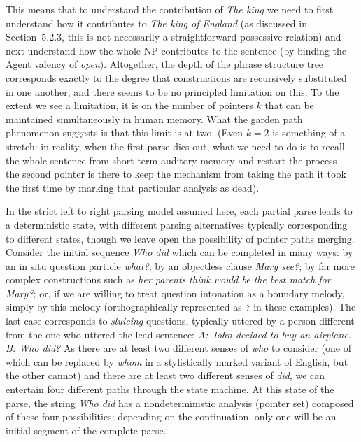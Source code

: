 This means that to understand the contribution of {\it The king} we need to
first understand how it contributes to {\it The king of England} (as discussed
in Section~5.2.3, this is not necessarily a straightforward possessive
relation) and next understand how the whole NP contributes to the sentence (by
binding the Agent valency of {\it open}).  Altogether, the depth of the phrase
structure tree corresponds exactly to the degree that constructions are
recursively substituted in one another, and there seems to be no principled
limitation on this. To the extent we see a limitation, it is on the number of
pointers $k$ that can be maintained simultaneously in human memory. What the
garden path phenomenon suggests is that this limit is at two. (Even $k=2$ is
something of a stretch: in reality, when the first parse dies out, what we
need to do is to recall the whole sentence from short-term auditory memory and
restart the process -- the second pointer is there to keep the mechanism from
taking the path it took the first time by marking that particular analysis as
dead).

In the strict left to right parsing model assumed here, each partial parse
leads to a deterministic state, with different parsing alternatives typically
corresponding to different states, though we leave open the possibility of
pointer paths merging. Consider the initial sequence {\it Who did} which can
be completed in many ways: by an in situ question particle {\it what?}; by an
objectless clause {\it Mary see?}; by far more complex constructions such as
{\it her parents think would be the best match for Mary?}; or, if we are
willing to treat question intonation as a boundary melody, simply by this
melody (orthographically represented as {\it ?} in these examples). The last
case corresponds to {\it sluicing} questions, typically
uttered by a person different from the one who uttered the lead sentence: {\it
  A: John decided to buy an airplane. B: Who did?} As there are at least two
different senses of {\it who} to consider (one of which can be replaced by
{\it whom} in a stylistically marked variant of English, but the other cannot)
and there are at least two different senses of {\it did}, we can entertain
four different paths through the state machine. At this state of the parse,
the string {\it Who did} has a nondeterministic analysis (pointer set)
composed of these four possibilities: depending on the continuation, only one
will be an initial segment of the complete parse.

